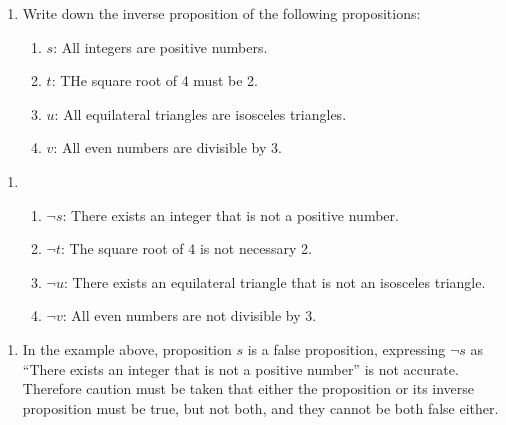 \documentclass{report}
\begin{document}
\vspace{0.5cm}
\begin{enumerate}[label=\textbf{Example \arabic*}, leftmargin=*, start=4]
    \item Write down the inverse proposition of the following propositions:
          \begin{enumerate}[label=, leftmargin=*]
              \item $s$: All integers are positive numbers.
              \item $t$: THe square root of 4 must be 2.
              \item $u$: All equilateral triangles are isosceles triangles.
              \item $v$: All even numbers are divisible by 3.
          \end{enumerate}
\end{enumerate}
\begin{enumerate}[label=\textbf{Sol.}, leftmargin=*]
    \item \begin{enumerate}[label=, leftmargin=*]
              \item $\neg s$: There exists an integer that is not a positive number.
              \item $\neg t$: The square root of 4 is not necessary 2.
              \item $\neg u$: There exists an equilateral triangle that is not an isosceles triangle.
              \item $\neg v$: All even numbers are not divisible by 3.
          \end{enumerate}
\end{enumerate}

\begin{enumerate}[label=\textbf{NOTE: }, leftmargin=*]
    \item In the example above, proposition $s$ is a false proposition, expressing $\neg
              s$ as ``There exists an integer that is not a positive number'' is not
          accurate. Therefore caution must be taken that either the proposition or its
          inverse proposition must be true, but not both, and they cannot be both false
          either.
\end{enumerate}
\end{document}
